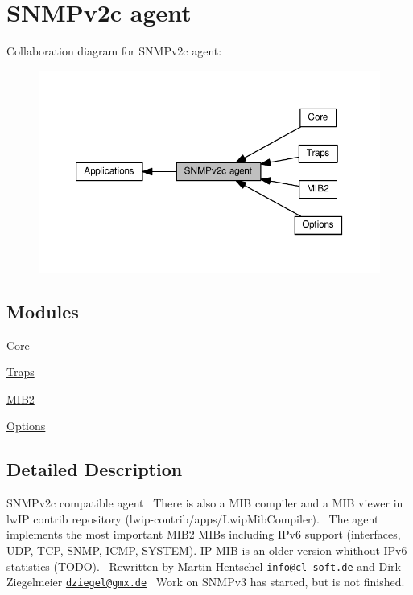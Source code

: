 \hypertarget{group__snmp}{}\section{S\+N\+M\+Pv2c agent}
\label{group__snmp}
Collaboration diagram for S\+N\+M\+Pv2c agent\+:
\nopagebreak
\begin{figure}[H]
\begin{center}
\leavevmode
\includegraphics[width=350pt]{group__snmp}
\end{center}
\end{figure}
\subsection*{Modules}
\begin{DoxyCompactItemize}
\item 
\hyperlink{group__snmp__core}{Core}
\item 
\hyperlink{group__snmp__traps}{Traps}
\item 
\hyperlink{group__snmp__mib2}{M\+I\+B2}
\item 
\hyperlink{group__snmp__opts}{Options}
\end{DoxyCompactItemize}


\subsection{Detailed Description}
S\+N\+M\+Pv2c compatible agent~\newline
There is also a M\+IB compiler and a M\+IB viewer in lw\+IP contrib repository (lwip-\/contrib/apps/\+Lwip\+Mib\+Compiler).~\newline
The agent implements the most important M\+I\+B2 M\+I\+Bs including I\+Pv6 support (interfaces, U\+DP, T\+CP, S\+N\+MP, I\+C\+MP, S\+Y\+S\+T\+EM). IP M\+IB is an older version whithout I\+Pv6 statistics (T\+O\+DO).~\newline
Rewritten by Martin Hentschel \href{mailto:info@cl-soft.de}{\tt info@cl-\/soft.\+de} and Dirk Ziegelmeier \href{mailto:dziegel@gmx.de}{\tt dziegel@gmx.\+de}~\newline
Work on S\+N\+M\+Pv3 has started, but is not finished.~\newline
